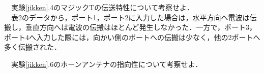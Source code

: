 　実験\ref{jikken}.4のマジックTの伝送特性について考察せよ．\\
　表2のデータから，ポート1，ポート2に入力した場合は，水平方向へ電波は伝搬し，垂直方向へは電波の伝搬はほとんど発生しなかった．一方で，ポート3，ポート4へ入力した際には，向かい側のポートへの伝搬は少なく，他の2ポートへ多く伝搬された．

　実験\ref{jikken}.6のホーンアンテナの指向性について考察せよ．\\
　

  
